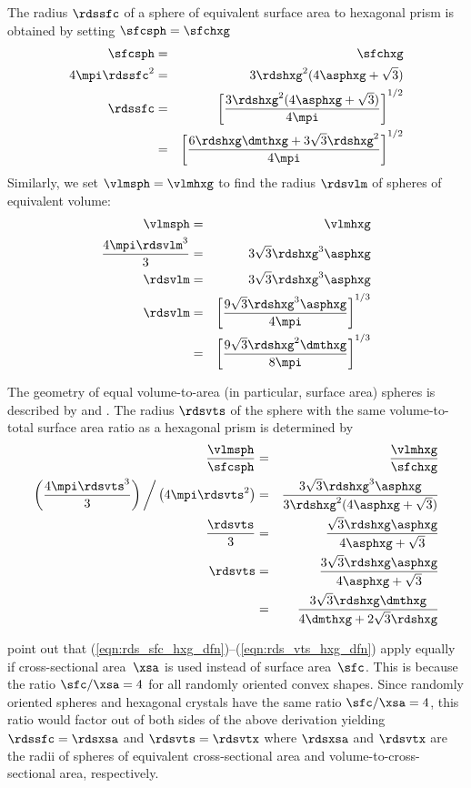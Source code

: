 \documentclass[12pt,twoside]{book}
\begin{document}
The radius $\rdssfc$ of a sphere of equivalent surface area 
to hexagonal prism is obtained by setting $\sfcsph=\sfchxg$ 
\begin{eqnarray}
\sfcsph & = & \sfchxg \nonumber \\
4\mpi\rdssfc^{2} & = & 3\rdshxg^{2}(4\asphxg+\sqrt{3}) \nonumber \\
\rdssfc & = & \left[ 
\frac{3\rdshxg^{2}(4\asphxg+\sqrt{3})}{4\mpi} \right]^{1/2} \\
& = & \left[ 
\frac{6\rdshxg\dmthxg + 3\sqrt{3}\rdshxg^{2}}{4\mpi} \right]^{1/2} \nonumber
\label{eqn:rds_sfc_hxg_dfn}
\end{eqnarray}
Similarly, we set $\vlmsph=\vlmhxg$ to find the radius $\rdsvlm$ of
spheres of equivalent volume: 
\begin{eqnarray}
\vlmsph & = & \vlmhxg \nonumber \\
\frac{4\mpi\rdsvlm^{3}}{3} & = & 3\sqrt{3}\rdshxg^{3}\asphxg \nonumber \\
\rdsvlm & = & 3\sqrt{3}\rdshxg^{3}\asphxg \nonumber \\
\rdsvlm & = & \left[ 
\frac{9\sqrt{3}\rdshxg^{3}\asphxg}{4\mpi} \right]^{1/3} \\
& = & \left[ 
\frac{9\sqrt{3}\rdshxg^{2}\dmthxg}{8\mpi} \right]^{1/3} \nonumber
\label{eqn:rds_vlm_hxg_dfn}
\end{eqnarray}

The geometry of equal volume-to-area (in particular, surface area)
spheres is described by \cite{GrW99} and \cite{NGW03}.
The radius $\rdsvts$ of the sphere with the same volume-to-total
surface area ratio as a hexagonal prism is determined by
\begin{eqnarray}
\frac{\vlmsph}{\sfcsph} & = & \frac{\vlmhxg}{\sfchxg} \nonumber \\
\left(\frac{4\mpi\rdsvts^{3}}{3}\right)\bigg/\left(4\mpi\rdsvts^{2}\right) & = & 
\frac{3\sqrt{3}\rdshxg^{3}\asphxg}{3\rdshxg^{2}(4\asphxg+\sqrt{3})} \nonumber \\
\frac{\rdsvts}{3} & = & 
\frac{\sqrt{3}\rdshxg\asphxg}{4\asphxg+\sqrt{3}} \nonumber \\
\rdsvts & = & 
\frac{3\sqrt{3}\rdshxg\asphxg}{4\asphxg+\sqrt{3}} \\
& = & \frac{3\sqrt{3}\rdshxg\dmthxg}{4\dmthxg+2\sqrt{3}\rdshxg} \nonumber
\label{eqn:rds_vts_hxg_dfn}
\end{eqnarray}

\cite{GrW99} point out that
(\ref{eqn:rds_sfc_hxg_dfn})--(\ref{eqn:rds_vts_hxg_dfn}) apply equally if
cross-sectional area~$\xsa$ is used instead of surface area~$\sfc$.
This is because the ratio $\sfc/\xsa = 4$ for all randomly oriented
convex shapes. 
Since randomly oriented spheres and hexagonal crystals have the same
ratio $\sfc/\xsa=4$, this ratio would factor out of both sides of the 
above derivation yielding $\rdssfc = \rdsxsa$ and $\rdsvts = \rdsvtx$
where $\rdsxsa$ and $\rdsvtx$ are the radii of spheres of equivalent 
cross-sectional area and volume-to-cross-sectional area, respectively.
\end{document}
